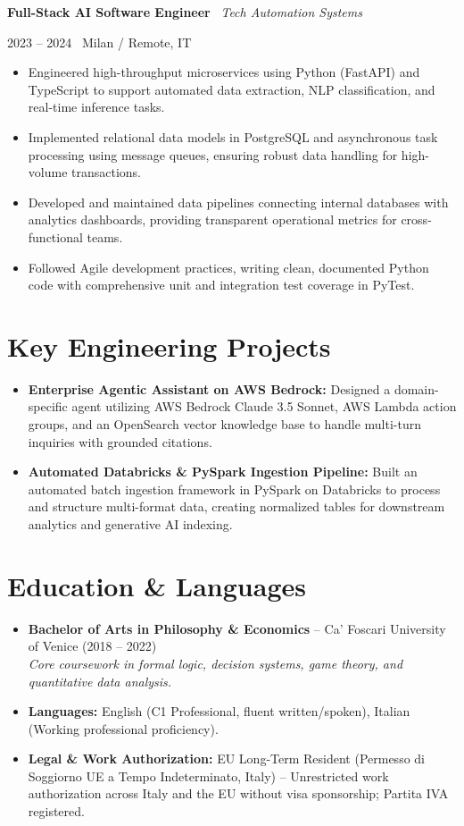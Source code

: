 \documentclass[a4paper,10pt]{article}
\newcommand{\role}[4]{%
  \vspace{2pt}\noindent
  \begin{minipage}[t]{0.70\textwidth}\raggedright\textbf{#1} \textbullet\ \textit{#3}\end{minipage}%
  \hfill
  \begin{minipage}[t]{0.28\textwidth}\raggedleft\footnotesize\color{gray}#2 \textbullet\ #4\end{minipage}%
  \vspace{1pt}%
}
\begin{document}
\vspace{3pt}
\role{Full-Stack AI Software Engineer}{2023 -- 2024}{Tech Automation Systems}{Milan / Remote, IT}
\begin{itemize}
  \item Engineered high-throughput microservices using Python (FastAPI) and TypeScript to support automated data extraction, NLP classification, and real-time inference tasks.
  \item Implemented relational data models in PostgreSQL and asynchronous task processing using message queues, ensuring robust data handling for high-volume transactions.
  \item Developed and maintained data pipelines connecting internal databases with analytics dashboards, providing transparent operational metrics for cross-functional teams.
  \item Followed Agile development practices, writing clean, documented Python code with comprehensive unit and integration test coverage in PyTest.
\end{itemize}

\section{Key Engineering Projects}
\begin{itemize}
  \item \textbf{Enterprise Agentic Assistant on AWS Bedrock:} Designed a domain-specific agent utilizing AWS Bedrock Claude 3.5 Sonnet, AWS Lambda action groups, and an OpenSearch vector knowledge base to handle multi-turn inquiries with grounded citations.
  \item \textbf{Automated Databricks \& PySpark Ingestion Pipeline:} Built an automated batch ingestion framework in PySpark on Databricks to process and structure multi-format data, creating normalized tables for downstream analytics and generative AI indexing.
\end{itemize}

\section{Education \& Languages}
\begin{itemize}
  \item \textbf{Bachelor of Arts in Philosophy \& Economics} -- Ca' Foscari University of Venice (2018 -- 2022) \\
  \textit{Core coursework in formal logic, decision systems, game theory, and quantitative data analysis.}
  \item \textbf{Languages:} English (C1 Professional, fluent written/spoken), Italian (Working professional proficiency).
  \item \textbf{Legal \& Work Authorization:} EU Long-Term Resident (Permesso di Soggiorno UE a Tempo Indeterminato, Italy) -- Unrestricted work authorization across Italy and the EU without visa sponsorship; Partita IVA registered.
\end{itemize}
\end{document}
